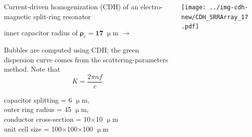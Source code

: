 \documentclass[t]{beamer} \usepackage[english]{babel} \usepackage[utf8]{inputenc} \usetheme{Frankfurt} %
\begin{document}
% 
\begin{frame}[plain]{}%
\begin{columns}[T] %
	\begin{column}{.55\textwidth}
	\vspace{3mm}
	\noindent Current-driven homogenization (CDH) of an electro-magnetic split-ring resonator 
	\begin{exampleblock}\hfill inner capacitor radius of $\pmb\rho_c=\pmb{17}\;\upmu$m $\rightarrow$\end{exampleblock}
	\vspace{3mm}

	\noindent Bubbles are computed using CDH; the green dispersion curve comes from the scattering-parameters method. Note that $$K = \frac{2\pi n f}{c}$$
	\vspace{12mm}

	\small{capacitor splitting = 6 $\upmu$m,\\ outer ring radius = 45 $\upmu$m,\\ conductor cross-section = 10$\times$10 $\upmu$m\\ unit cell size = 100$\times$100$\times$100 $\upmu$m}
	\vspace{5mm}

	\end{column}%
	\begin{column}{.45\textwidth}%
		\vspace{-1mm}\texttt{[image: ../img-cdh-new/CDH\_SRRArray\_17.pdf]} 
	\end{column}
\end{columns}
\end{frame} 		%
\end{document}
